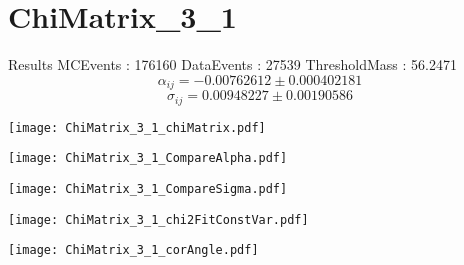 \documentclass[a4paper,12pt]{article}
\begin{document}
\section{ChiMatrix\_3\_1}
\begin{minipage}{0.49\linewidth} Results \newline
MCEvents : 176160\newline
DataEvents : 27539 \newline
ThresholdMass : 56.2471\\
$$\alpha_{ij} = -0.00762612\pm 0.000402181$$
$$\sigma_{ij} = 0.00948227\pm 0.00190586$$
\end{minipage}\hfill
\begin{minipage}{0.49\linewidth} 
\texttt{[image: ChiMatrix\_3\_1\_chiMatrix.pdf]}\\
\end{minipage}
\hfill
\begin{minipage}{0.49\linewidth} 
\texttt{[image: ChiMatrix\_3\_1\_CompareAlpha.pdf]}\\
\end{minipage}
\hfill
\begin{minipage}{0.49\linewidth} 
\texttt{[image: ChiMatrix\_3\_1\_CompareSigma.pdf]}\\
\end{minipage}
\begin{minipage}{0.49\linewidth} 
\texttt{[image: ChiMatrix\_3\_1\_chi2FitConstVar.pdf]}\\
\end{minipage}
\hfill
\begin{minipage}{0.49\linewidth} 
\texttt{[image: ChiMatrix\_3\_1\_corAngle.pdf]}\\
\end{minipage}
\end{document}
